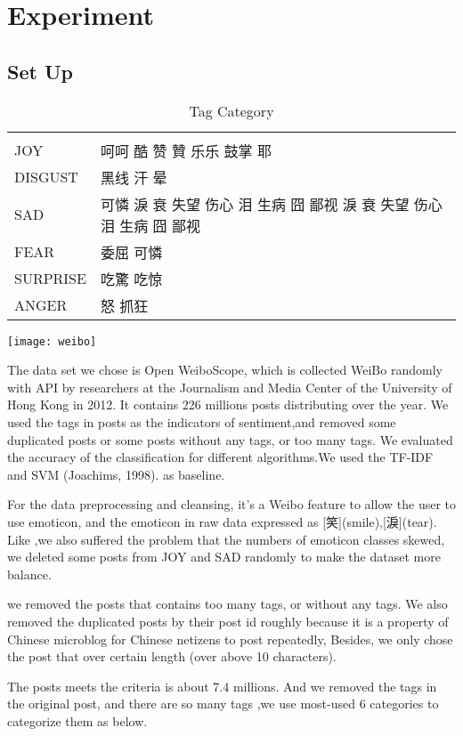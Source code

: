 \chapter{Experiment}

\section{Set Up}
\begin{table}[]
\centering
\caption{Tag Category}
\label{CategoryTable}
\begin{tabular}{ll}
      &  \\
JOY  & 呵呵 酷 赞 贊 乐乐 鼓掌 耶 \\
DISGUST & 黑线 汗 晕 \\
SAD &   可憐 淚 衰 失望 伤心 泪 生病 囧 鄙视  淚 衰 失望 伤心 泪 生病 囧 鄙视  \\
FEAR &  委屈  可憐 \\
SURPRISE &  吃驚 吃惊 \\
ANGER & 怒 抓狂
\end{tabular}
\end{table}

\texttt{[image: weibo]}

The data set we chose is Open WeiboScope\cite{fu2013reality}, which is collected WeiBo randomly with API by researchers at the Journalism and Media Center of the University of Hong Kong in 2012. 
It contains 226 millions posts distributing over the year. We used the tags in posts as the indicators of sentiment,and removed some duplicated posts or some posts without any tags, or too many tags. 
We evaluated the accuracy of the classification for different algorithms.We used the TF-IDF and SVM (Joachims, 1998). as baseline.

For the data preprocessing and cleansing, it's a Weibo feature to allow the user to use emoticon, 
and the emoticon in raw data expressed as [笑](smile),[淚](tear). Like \cite{zhao2012moodlens},we also suffered the problem that the numbers of emoticon classes skewed,
 we deleted some posts from JOY and SAD randomly to make the dataset more balance.  

we removed the posts that contains too many tags, or without any tags. We also removed the duplicated posts by their post id roughly because it is a property of Chinese microblog \cite{fu2013reality} for Chinese netizens to post repeatedly, 
Besides, we only chose the post that over certain length (over above 10 characters).

The posts meets the criteria is about 7.4 millions. And we removed the tags in the original post, and there are so many tags 
,we use most-used 6 categories to categorize them as below.
